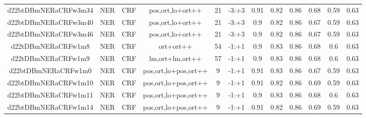 \documentclass[a4paper]{article}
\begin{document}
\begin{landscape}
\begin{center}
\begin{tabular}{ |c|c|c|c|c|c|c|c|c|c|c|c|}
 	
 
 	
 		
 		\small{ d22btDBmNERaCRFw3m34 } & NER & CRF & pos,ort,lo+ort++  &  21 &  -3:+3  &  0.91 & 0.82 & 0.86  &  0.68 & 0.59 & 0.63 \\
 		

 	
 
 	
 		
 		\small{ d22btDBmNERaCRFw3m40 } & NER & CRF & pos,ort,lo+ort++  &  21 &  -3:+3  &  0.9 & 0.82 & 0.86  &  0.67 & 0.59 & 0.63 \\
 		

 	
 
 	
 		
 		\small{ d22btDBmNERaCRFw3m46 } & NER & CRF & pos,ort,lo+ort++  &  21 &  -3:+3  &  0.9 & 0.82 & 0.86  &  0.67 & 0.59 & 0.63 \\
 		

 	
 
 	
 		
 		\small{ d22tDBmNERaCRFw1m8 } & NER & CRF & ort+ort++  &  54 &  -1:+1  &  0.9 & 0.83 & 0.86  &  0.68 & 0.6 & 0.63 \\
 		

 	
 
 	
 		
 		\small{ d22tDBmNERaCRFw1m9 } & NER & CRF & lm,ort+lm,ort++  &  57 &  -1:+1  &  0.9 & 0.83 & 0.86  &  0.68 & 0.6 & 0.63 \\
 		

 	
 
 	
 		
 		\small{ d22btDBmNERaCRFw1m0 } & NER & CRF & pos,ort,lo+pos,ort++  &  9 &  -1:+1  &  0.91 & 0.83 & 0.86  &  0.67 & 0.59 & 0.63 \\
 		

 	
 
 	
 		
 		\small{ d22btDBmNERaCRFw1m10 } & NER & CRF & pos,ort,lo+pos,ort++  &  9 &  -1:+1  &  0.91 & 0.82 & 0.86  &  0.69 & 0.59 & 0.63 \\
 		

 	
 
 	
 		
 		\small{ d22btDBmNERaCRFw1m11 } & NER & CRF & pos,ort,lo+pos,ort++  &  9 &  -1:+1  &  0.9 & 0.83 & 0.86  &  0.68 & 0.6 & 0.63 \\
 		

 	
 
 	
 		
 		\small{ d22btDBmNERaCRFw1m14 } & NER & CRF & pos,ort,lo+pos,ort++  &  9 &  -1:+1  &  0.91 & 0.82 & 0.86  &  0.69 & 0.59 & 0.63 \\
 		


\end{tabular}
\end{center}
\end{landscape}
\end{document}
